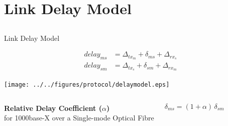 \documentclass[compress,red]{beamer}
\begin{document}
\section{Link Delay Model}
\subsection{}
\begin{frame}{Link Delay Model}

  \begin{align}
    \nonumber delay_{ms} &= \Delta_{tx_m} + \delta_{ms} + \Delta_{rx_s} \\
    \nonumber delay_{sm} &= \Delta_{tx_s} + \delta_{sm} + \Delta_{rx_m}
  \end{align}

   \vspace{0.2cm}

  \begin{center}
  \texttt{[image: ../../figures/protocol/delaymodel.eps]}
  \end{center}

\begin{columns}[c]
  \column{2.8in}

    \begin{center}
      \textbf{Relative Delay Coefficient ($\alpha$)} \\
      for 1000base-X over a Single-mode Optical Fibre
    \end{center}

  \column{1.5in}
    \begin{center}
      \begin{equation}
      \nonumber \delta_{ms} = (1 + \alpha) \, \delta_{sm}
      \end{equation}
    \end{center}
    \vspace{0.5cm}
\end{columns}
  

\end{frame}
\end{document}
